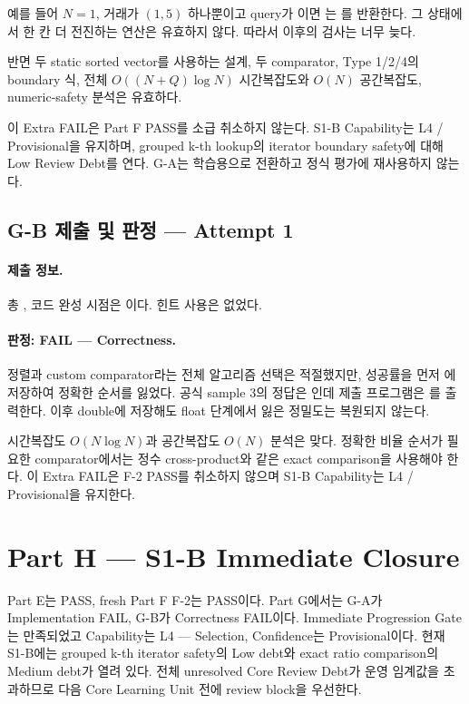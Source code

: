 예를 들어 $N=1$, 거래가 $(1,5)$ 하나뿐이고 query가 이면 는 를 반환한다. 그 상태에서 한 칸 더 전진하는 연산은 유효하지 않다. 따라서 이후의  검사는 너무 늦다.

반면 두 static sorted vector를 사용하는 설계, 두 comparator, Type 1/2/4의 boundary 식, 전체 $O((N+Q)\log N)$ 시간복잡도와 $O(N)$ 공간복잡도, numeric-safety 분석은 유효하다.

이 Extra FAIL은 Part F PASS를 소급 취소하지 않는다. S1-B Capability는 L4 / Provisional을 유지하며, grouped k-th lookup의 iterator boundary safety에 대해 Low Review Debt를 연다. G-A는 학습용으로 전환하고 정식 평가에 재사용하지 않는다.


\subsection{G-B 제출 및 판정 --- Attempt 1}
\paragraph{제출 정보.} 총 , 코드 완성 시점은 이다. 힌트 사용은 없었다.

\paragraph{판정: FAIL --- Correctness.} 정렬과 custom comparator라는 전체 알고리즘 선택은 적절했지만, 성공률을 먼저 에 저장하여 정확한 순서를 잃었다. 공식 sample 3의 정답은 인데 제출 프로그램은 를 출력한다. 이후 double에 저장해도 float 단계에서 잃은 정밀도는 복원되지 않는다.

시간복잡도 $O(N\log N)$과 공간복잡도 $O(N)$ 분석은 맞다. 정확한 비율 순서가 필요한 comparator에서는 정수 cross-product와 같은 exact comparison을 사용해야 한다. 이 Extra FAIL은 F-2 PASS를 취소하지 않으며 S1-B Capability는 L4 / Provisional을 유지한다.

\section{Part H --- S1-B Immediate Closure}
Part E는 PASS, fresh Part F F-2는 PASS이다. Part G에서는 G-A가 Implementation FAIL, G-B가 Correctness FAIL이다. Immediate Progression Gate는 만족되었고 Capability는 L4 --- Selection, Confidence는 Provisional이다. 현재 S1-B에는 grouped k-th iterator safety의 Low debt와 exact ratio comparison의 Medium debt가 열려 있다. 전체 unresolved Core Review Debt가 운영 임계값을 초과하므로 다음 Core Learning Unit 전에 review block을 우선한다.


